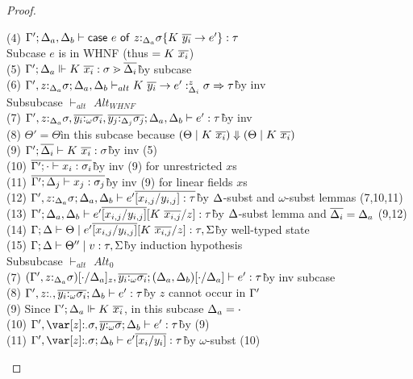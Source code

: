 \documentclass[acmsmall,review,anonymous,screen]{acmart}
\newcommand{\ccase}[2]{\mathsf{case}~#1~\mathsf{of}~#2}
\begin{document}
\begin{proof}
\begin{description}
\begin{tabbing}
    (4) $\G'; \D_a, \D_b \vdash \ccase{e}{z{:}_{\D_a}\s\{K~\ov{y_i}\to e'\}} : \tau$\\
    Subcase $e$ is in WHNF (thus $= K~\overline{x_i}$)\\
    (5) $\Gamma'; \Delta_a \Vdash K~\overline{x_i} : \sigma \gtrdot \overline{\Delta_i}$\` by subcase\\
    (6) $\Gamma', z{:}_{\Delta_a}\sigma; \Delta_a, \Delta_b \vdash_{alt} K~\overline{y_i} \to e' :^z_{\Delta_i} \sigma \Rightarrow \tau$\` by inv\\
    Subsubcase $\vdash_{alt}$ $Alt_{WHNF}$\\
    (7) $\Gamma', z{:}_{\Delta_a}\sigma, \overline{y_i{:}_\omega\sigma_i}, \overline{y_j{:}_{\Delta_j}\sigma_j}; \Delta_a, \Delta_b \vdash e' : \tau$\` by inv\\
    (8) $\Theta' = \Theta$\` in this subcase because $(\Theta \mid K~\overline{x_i})\Downarrow(\Theta \mid K~\overline{x_i})$\\
    (9) $\Gamma'; \overline{\Delta_i} \vdash K~\overline{x_i} : \sigma$\` by inv (5)\\
    (10) $\overline{\Gamma'; \cdot \vdash x_i : \sigma_i}$\` by inv (9) for unrestricted $x$s\\
    (11) $\overline{\Gamma'; \Delta_j \vdash x_j : \sigma_j}$\` by inv (9) for linear fields $x$s\\
    (12) $\Gamma', z{:}_{\Delta_a}\sigma; \Delta_a, \Delta_b \vdash e'\overline{[x_{i,j}/y_{i,j}] : \tau}$\` by $\Delta$-subst and $\omega$-subst lemmas (7,10,11)\\
    (13) $\Gamma'; \Delta_a, \Delta_b \vdash e'\overline{[x_{i,j}/y_{i,j}]}[K~\overline{x_{i,j}}/z] : \tau$\` by $\Delta$-subst lemma and $\overline{\Delta_i} = \Delta_a$ (9,12)\\
    (14) $\Gamma; \Delta \vdash \Theta \mid e'\overline{[x_{i,j}/y_{i,j}]}[K~\overline{x_{i,j}}/z] : \tau, \Sigma$\` by well-typed state\\
    (15) $\Gamma; \Delta \vdash \Theta'' \mid v : \tau, \Sigma$\` by induction hypothesis\\
    Subsubcase $\vdash_{alt}$ $Alt_{0}$\\
    (7) $(\Gamma', z{:}_{\Delta_a}\sigma)[\cdot/\Delta_a]_z, \overline{y_i{:}_\omega\sigma_i}; (\Delta_a, \Delta_b)[\cdot / \Delta_a] \vdash e' : \tau$\` by inv subcase\\
    (8) $\Gamma', z{:}_{\cdot}, \overline{y_i{:}_\omega\sigma_i}; \Delta_b \vdash e' : \tau$\` by $z$ cannot occur in $\Gamma'$\\
    (9) Since $\Gamma';\Delta_a \Vdash K~\overline{x_i}$, in this subcase $\Delta_a = \cdot$\\
    (10) $\G', \z{:}_\cdot\sigma, \ov{y{:}_\omega\sigma}; \D_b \vdash e' : \tau$\` by (9)\\
    (11) $\G', \z{:}_\cdot\sigma; \D_b \vdash e'\ov{[x_i/y_i]} : \tau$\` by $\omega$-subst (10)\\

\end{tabbing}
\end{description}
\end{proof}
\end{document}
